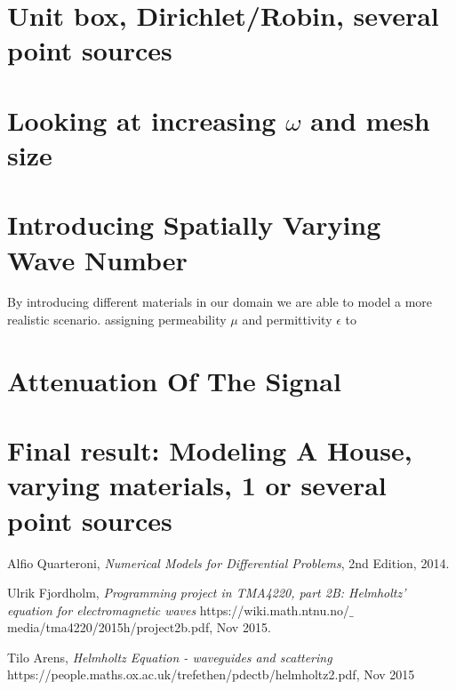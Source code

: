 \documentclass[10pt,a4paper]{article}
\begin{document}
\section*{Unit box, Dirichlet/Robin, several point sources }


\section*{Looking at increasing $\omega$ and mesh size}

\section*{Introducing Spatially Varying Wave Number}
By introducing different materials in our domain we are able to model a more realistic scenario.  assigning permeability $\mu$ and permittivity $\epsilon$ to  

\section*{Attenuation Of The Signal}


\section*{Final result: Modeling A House, varying materials, 1 or several point sources }






\begin{thebibliography}{}

Alfio Quarteroni, \emph{Numerical Models for Differential Problems}, 2nd Edition, 2014.

Ulrik Fjordholm, \emph{Programming project in TMA4220, part 2B:
Helmholtz' equation for electromagnetic waves} https://wiki.math.ntnu.no/$\_$media/tma4220/2015h/project2b.pdf, Nov 2015.

Tilo Arens, \emph{Helmholtz Equation - waveguides and scattering} https://people.maths.ox.ac.uk/trefethen/pdectb/helmholtz2.pdf, Nov 2015


\end{thebibliography}
\end{document}
